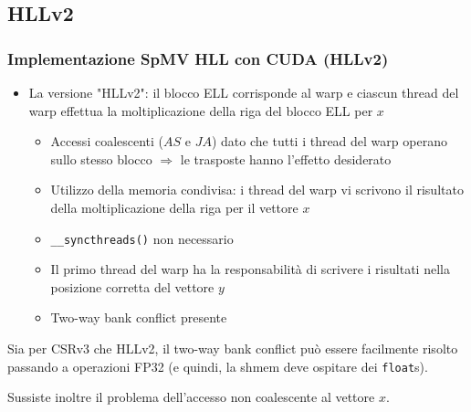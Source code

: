 \documentclass{beamer}
\begin{document}
\subsection{HLLv2}
\begin{frame}
    \frametitle{Implementazione SpMV HLL con CUDA (HLLv2)}
    
    \begin{itemize}
    	
    	\item La versione "HLLv2": il blocco ELL corrisponde al warp e ciascun thread del warp
    	effettua la moltiplicazione della riga del blocco ELL per $x$
    	
    	\begin{itemize}
    		\item Accessi coalescenti ($AS$ e $JA$)
    		dato che tutti i thread del warp operano sullo stesso blocco
    		$\Rightarrow$ le trasposte hanno l'effetto desiderato
    		
    		\item Utilizzo della memoria condivisa: i thread del warp vi scrivono il risultato
    		della moltiplicazione della riga per il vettore $x$
    		
    		\item \texttt{\_\_syncthreads()} non necessario
    		\item Il primo thread del warp ha la responsabilità di scrivere i risultati
    		nella posizione corretta del vettore $y$
    		
    		\item Two-way bank conflict presente
    	\end{itemize}
    	
    \end{itemize}
    
    Sia per CSRv3 che HLLv2, il two-way bank conflict può essere facilmente risolto passando
    a operazioni FP32 (e quindi, la shmem deve ospitare dei \texttt{float}s).
    
    Sussiste inoltre il problema dell'accesso non coalescente al vettore $x$.
    
\end{frame}
\end{document}
